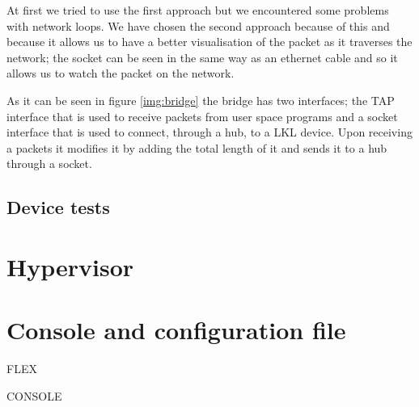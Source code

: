At first we tried to use the first approach but we encountered some problems with network loops.
We have chosen the second approach because of this and because it allows us to have a better visualisation of the packet
as it traverses the network; the socket can be seen in the same way as an ethernet cable and so it allows
us to watch the packet on the network.


As it can be seen in figure \ref{img:bridge} the bridge has two interfaces; the TAP interface that is used to 
receive packets from user space programs and a socket interface that is used to connect, through a hub, to 
a LKL device. Upon receiving a packets it modifies it by adding the total length of it and sends it to a hub 
through a socket.

\subsection{Device tests}
\label{sub-sec:bridge-tests}

\section{Hypervisor}
\label{sec:hypervisor2}

\section{Console and configuration file}
\label{sec:dev-conf}

FLEX

CONSOLE